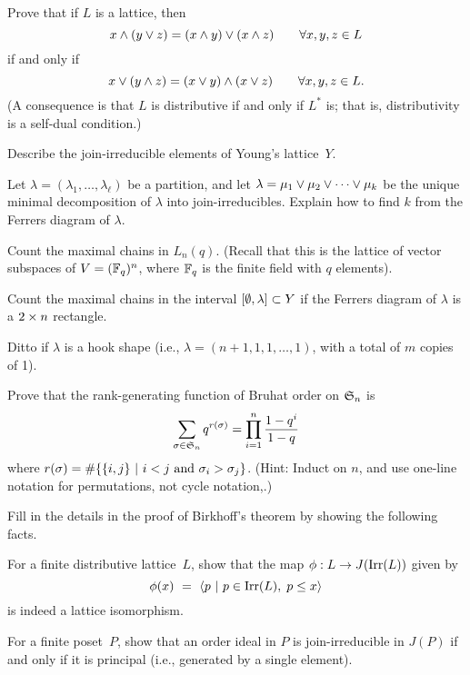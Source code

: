 \prob
Prove that if $L$ is a lattice, then
  $$x\wedge(y\vee z)=(x\wedge y)\vee(x\wedge z) \qquad \forall x,y,z\in L$$
if and only if
  $$x\vee(y\wedge z)=(x\vee y)\wedge(x\vee z) \qquad \forall x,y,z\in L.$$
(A consequence is that $L$ is distributive if and only if $L^*$ is;
that is, distributivity is a self-dual condition.)

\prob 
\probpart Describe the join-irreducible elements of Young's lattice~$Y$.

\probpart Let $\lambda=(\lambda_1,\dots,\lambda_\ell)$ be a partition,
  and let $\lambda=\mu_1\vee\mu_2\vee\cdots\vee\mu_k$ be the
  unique minimal decomposition of $\lambda$ into join-irreducibles.
  Explain how to find $k$ from the Ferrers diagram of $\lambda$.

\prob
\probpart Count the maximal chains in $L_n(q)$. (Recall that this is
the lattice of vector subspaces of $V=(\mathbb{F}_q)^n$, where $\mathbb{F}_q$
is the finite field with $q$ elements).

\probpart Count the maximal chains in the interval $[\emptyset,\lambda]\subset Y$
if the Ferrers diagram of $\lambda$ is a $2\times n$ rectangle.

\probpart Ditto if $\lambda$ is a hook shape (i.e., $\lambda=(n+1,1,1,\dots,1)$,
with a total of $m$ copies of 1).

\prob Prove that the rank-generating function of Bruhat order on $\mathfrak{S}_n$ is
\[\sum_{\sigma\in\mathfrak{S}_n} q^{r(\sigma)} = \prod_{i=1}^n \frac{1-q^i}{1-q}\]
where $r(\sigma)=\#\{\{i,j\} ~|~ i<j~\text{and}~\sigma_i>\sigma_j\}$.
(Hint: Induct on $n$, and use one-line notation
for permutations, not cycle notation,.)

\prob
Fill in the details in the proof of Birkhoff's theorem by showing the following facts.

\probpart For a finite distributive lattice~$L$, show that the map $\phi:L\to J(\operatorname{Irr}(L))$
given by
  $$\phi(x) ~=~ \langle p ~|~ p\in\operatorname{Irr}(L),\; p\leq x \rangle$$
is indeed a lattice isomorphism.

\probpart For a finite poset~$P$, show that an order ideal in $P$ is join-irreducible in
$J(P)$ if and only if it is principal (i.e., generated by a single element).


